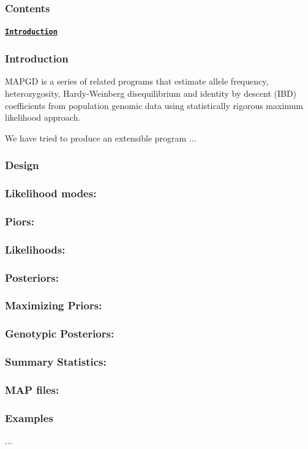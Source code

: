 \subsubsection*{Contents}

\paragraph*{\href{https://lynchlab.github.io/MAPGD/index.html#-introduction-}{\tt Introduction}}

\subsubsection*{Introduction }

M\-A\-P\-G\-D is a series of related programs that estimate allele frequency, heterozygosity, Hardy-\/\-Weinberg disequilibrium and identity by descent (I\-B\-D) coefficients from population genomic data using statistically rigorous maximum likelihood approach.

We have tried to produce an extensible program ...

\subsubsection*{Design }

\subsubsection*{Likelihood modes\-:}

\subsubsection*{Piors\-:}

\subsubsection*{Likelihoods\-:}

\subsubsection*{Posteriors\-:}

\subsubsection*{Maximizing Priors\-:}

\subsubsection*{Genotypic Posteriors\-:}

\subsubsection*{Summary Statistics\-:}

\subsubsection*{M\-A\-P files\-:}

\subsubsection*{Examples }

... 